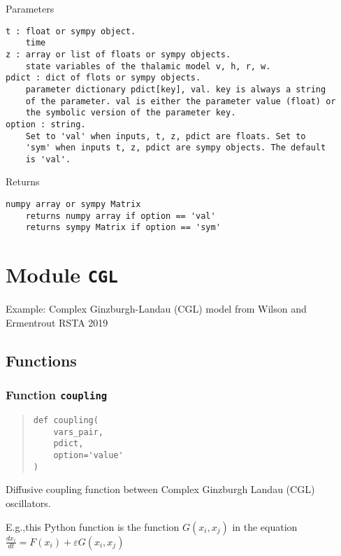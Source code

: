 \documentclass[english,a4paper,oneside]{article}
\begin{document}
Parameters

\begin{verbatim}
t : float or sympy object.
    time
z : array or list of floats or sympy objects.
    state variables of the thalamic model v, h, r, w.
pdict : dict of flots or sympy objects.
    parameter dictionary pdict[key], val. key is always a string
    of the parameter. val is either the parameter value (float) or 
    the symbolic version of the parameter key.
option : string.
    Set to 'val' when inputs, t, z, pdict are floats. Set to
    'sym' when inputs t, z, pdict are sympy objects. The default
    is 'val'.
\end{verbatim}

Returns

\begin{verbatim}
numpy array or sympy Matrix
    returns numpy array if option == 'val'
    returns sympy Matrix if option == 'sym'
\end{verbatim}

\hypertarget{CGL}{%
\section{\texorpdfstring{Module \texttt{CGL}}{Module CGL}}\label{CGL}}

Example: Complex Ginzburgh-Landau (CGL) model from Wilson and Ermentrout
RSTA 2019

\hypertarget{functions-2}{%
\subsection{Functions}\label{functions-2}}

\hypertarget{CGL.coupling}{%
\subsubsection{\texorpdfstring{Function
\texttt{coupling}}{Function coupling}}\label{CGL.coupling}}

\begin{quote}
\begin{verbatim}
def coupling(
    vars_pair,
    pdict,
    option='value'
)
\end{verbatim}
\end{quote}

Diffusive coupling function between Complex Ginzburgh Landau (CGL)
oscillators.

E.g.,this Python function is the function \(G(x_i,x_j)\) in the equation
\(\frac{dx_i}{dt} = F(x_i) + \varepsilon G(x_i,x_j)\)
\end{document}

